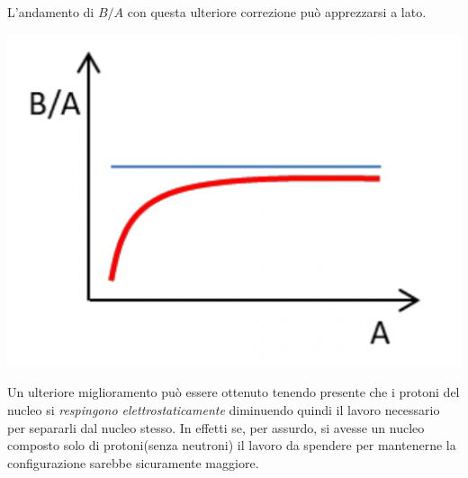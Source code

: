 L'andamento di \(B / A\) con questa ulteriore correzione
può apprezzarsi a lato.
\begin{marginfigure}
	\includegraphics{figs/goccia2}
	\label{fig:goccia2}
\end{marginfigure}

Un ulteriore miglioramento può essere ottenuto tenendo presente che i
protoni del nucleo si \emph{respingono elettrostaticamente} diminuendo
quindi il lavoro necessario per separarli dal nucleo stesso.
In effetti
se, per assurdo, si avesse un nucleo composto solo di protoni(senza
neutroni) il lavoro da spendere per mantenerne la configurazione sarebbe
sicuramente maggiore.

